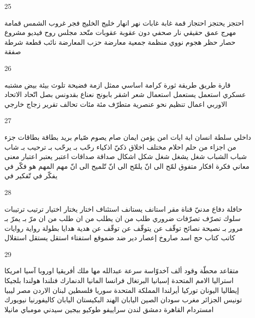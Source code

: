 \documentclass[twocolumn,a4paper]{article}
\begin{document}
25

\textarabic{ احتجز  يحتجز  احتجاز   
 قمة  
 غابة  غابات
 نهر  انهار  
 خليج  
 الخليج  
 فجر  
 غروب الشمس  
 قمامة  
 مهرج  
 عمق  
 حقيقي  
 نار  
 صحفي  
 دون  
 عقوبة  عقوبات
 متّحد  
 مجلس  
 روح  
 فيديو  
 مشروع  
 حصار  
 حظر  
 هجوم  
 نووي  
 منظمة  
 جمعية  
 معارضة  
 حزب المعارضة  
 نائب  
 قطعة  
 شرطة  
 صفقة  
}

26

\textarabic{ قارة  
 طريق  
 طريقة  
 ثورة  
 كرامة  
 اساسي  
 ممثل  
 ازمة  
 فضيحة  
 تلوث  
 بيئة  
 بيض  
 مشتبه  
 عسكري  
 استعمل  يستعمل  استعمال   
 شعر  
 اشقر  
 بابونج  
 نعناع  
 بقدونس  
 بصل  
 اتّحاد  
 الاتحاد الاوربي  
 اعمال  
 تنظيم  
 نحو  
 عنصرية  
 متطرّف  
 مئة  مئات
 تحالف  
 تقرير  
 زجاج  
 خارجي  
}

27

\textarabic{ داخلي  
 سلطة  
 انسان  
 اية  ايات
 امن  يؤمن  ايمان  
 صام  يصوم  صّيام   
 بريد  
 بطاقة  بطاقات
 جزء من  اجزاء من  
 حلم  احلام  
 مختلف  
 اخلاق  
 ذكيّ  اذكياء  
 رحّب بـ  يرحّب بـ  ترحيب بـ   
 شاب  شباب  
 الشباب  
 شغل  يشغل  شغل   
 شكل  اشكال  
 صداقة  صداقات
 اعتبر  يعتبر  اعتبار   
 معنى  معاني  
 فكرة  افكار  
 متفوق  
 لمّح الى انّ  يلمّح الى انّ  تّلميح الى انّ   
 مهم  
 المهم هو  
 فكّر في  يفكّر في  تّفكير في  
}

28

\textarabic{ حافلة  
 دفاع  
 مدنيّ  
 قناة  
 مقر  
 استانف  يستانف  استئناف  
 اختار  يختار  اختيار  
 ترتيب  ترتيبات
 سلوك  
 تصرّف  تصرّفات
 ضروري  
 طلب من ان  يطلب من ان  طلب من ان   
 مرّ بـ  يمرّ بـ  مرور بـ  
 نصيحة  نصائح  
 توقّف عن  يتوقّف عن  توقّف عن  
 هدية  هدايا  
 بطولة  
 رواية  روايات
 كاتب  كتاب  
 حج  
 اسد  
 صاروخ  
 إعصار  
 دير  
 ضد  
 ضموقع  
 استفتاء  
 استقل  يستقل  استقلال  
}

29

\textarabic{ متقاعد  
 محطّة  
 وقود  
 ألف  
 آخدوّاسة  
 سرعة  
}\clearpage
\textarabic{
 عبدالله  
 مها  
 ملك  
}\clearpage
\textarabic{
 أفريقيا  
 اوروبا  
 آسيا  
 امريكا  
 استراليا  
 اﻻمم المتحدة  
 إسبانيا  
 البرتغال  
 فرانسا  
 المانيا  
  الدنمارك  
 فنلندا  
 هولندا  
 بلجيكا  
 إيطاليا  
 اليونان  
 توركيا  
 أيرلندا  
 المملكة المتحدة 
 سوريا  
 فلسطين  
 لبنان  
 الاردن  
 مصر  
 ليبيا  
 تونيس  
 الجزائر  
 مغرب  
 سودان  
 الصين  
 اليابان  
 الهند  
 البكيستان  
 اليابان  
 كاليفورنيا  
 نيويورك  
 امستردام  
 القاهرة  
 دمشق  
 لندن  
 سراييفو  
 طوكيو  
 بيجين  
 سيدني  
 مومباي  
 مانيلا  
}
\end{document}
